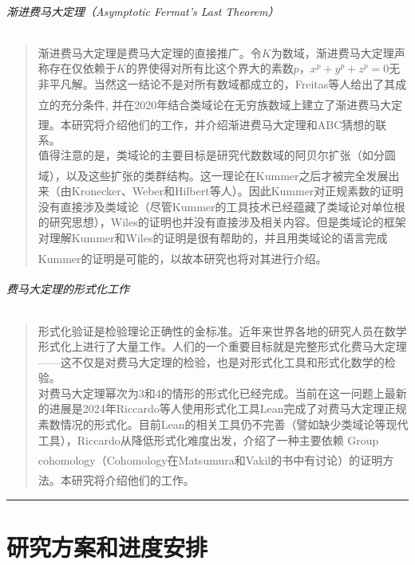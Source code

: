 \documentclass{article}
\newcommand{\upcite}[1]{\textsuperscript{\textsuperscript{\cite{#1}}}}
\begin{document}
\paragraph{渐进费马大定理（Asymptotic Fermat's Last Theorem）}

\begin{quote}
渐进费马大定理是费马大定理的直接推广。令$K$为数域，渐进费马大定理声称存在仅依赖于$K$的界使得对所有比这个界大的素数$p$，$x^p + y^p + z^p=0$无非平凡解。当然这一结论不是对所有数域都成立的，Freitas等人给出了其成立的充分条件\upcite{ref13}, 并在2020年结合类域论在无穷族数域上建立了渐进费马大定理\upcite{ref10}。本研究将介绍他们的工作，并介绍渐进费马大定理和ABC猜想的联系。\\

值得注意的是，类域论的主要目标是研究代数数域的阿贝尔扩张（如分圆域）\upcite{ref6}，以及这些扩张的类群结构\upcite{ref4}。这一理论在Kummer之后才被完全发展出来（由Kronecker、Weber和Hilbert等人）。因此Kummer对正规素数的证明没有直接涉及类域论（尽管Kummer的工具技术已经蕴藏了类域论对单位根的研究思想），Wiles的证明也并没有直接涉及相关内容。但是类域论的框架对理解Kummer和Wiles的证明是很有帮助的，并且用类域论的语言完成Kummer的证明是可能的\upcite{ref14}，以故本研究也将对其进行介绍。
\end{quote}

\paragraph{费马大定理的形式化工作}

\begin{quote}
形式化验证是检验理论正确性的金标准。近年来世界各地的研究人员在数学形式化上进行了大量工作。人们的一个重要目标就是完整形式化费马大定理——这不仅是对费马大定理的检验，也是对形式化工具和形式化数学的检验。\\

对费马大定理幂次为3和4的情形的形式化已经完成。当前在这一问题上最新的进展是2024年Riccardo等人使用形式化工具Lean完成了对费马大定理正规素数情况的形式化。目前Lean的相关工具仍不完善（譬如缺少类域论等现代工具），Riccardo从降低形式化难度出发，介绍了一种主要依赖 Group cohomology（Cohomology在Matsumura\upcite{ref5}和Vakil\upcite{ref7}的书中有讨论）的证明方法。本研究将介绍他们的工作\upcite{ref12}。
\end{quote}

\newpage
\hrule
\part{研究方案和进度安排}
\end{document}
